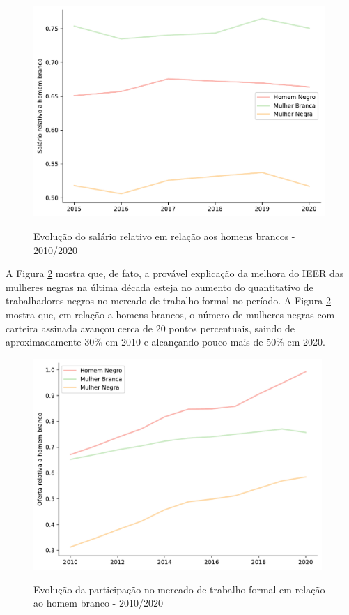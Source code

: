 \documentclass[12pt]{article}
\begin{document}
\begin{figure}[H]
    \centering
    \caption{Evolução do salário relativo em relação aos homens brancos - 2010/2020}
        \includegraphics[height=8cm]{../figures/wage_gap.pdf}
    \label{fig:wage_gap}
\end{figure}

\par A Figura \ref{fig:supply_gap} mostra que, de fato, a provável explicação da melhora do IEER das mulheres negras na última década esteja no aumento do quantitativo de trabalhadores negros no mercado de trabalho formal no período. A Figura \ref{fig:supply_gap} mostra que, em relação a homens brancos, o número de mulheres negras com carteira assinada avançou cerca de 20 pontos percentuais, saindo de aproximadamente 30\% em 2010 e alcançando pouco mais de 50\% em 2020.


\begin{figure}[H]
    \centering
    \caption{Evolução da participação no mercado de trabalho formal em relação ao homem branco - 2010/2020}
        \includegraphics[height=8cm]{../figures/supply_gap.pdf}
    \label{fig:supply_gap}
\end{figure}
\end{document}
